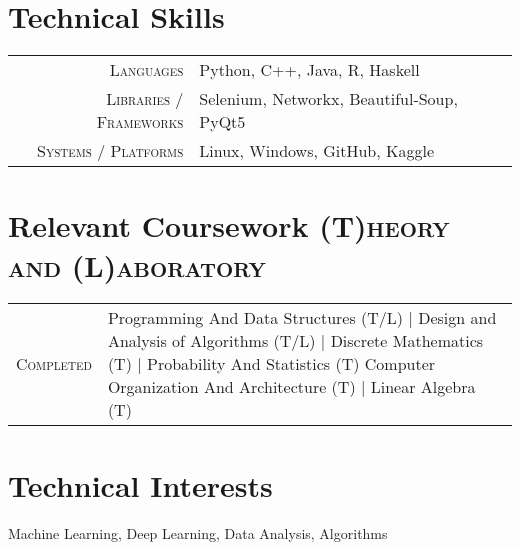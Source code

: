 \documentclass[a4paper,10pt]{extarticle} %
\begin{document}
\vspace{-0.6cm}
\section{\textcolor{primary}{Technical Skills}}

\begin{tabular}{r|p{15cm}}
\textsc{Languages} &  Python, C++, Java, R, Haskell \\
\textsc{Libraries / Frameworks} & Selenium, Networkx, Beautiful-Soup, PyQt5\\
\textsc{Systems / Platforms} &  Linux, Windows, GitHub, Kaggle \\
\end{tabular}
\vspace{0.4cm}



\vspace{-0.2cm}
\section{\textcolor{primary}{Relevant Coursework}
\hfill\small\textsc{(T)heory and (L)aboratory}}

\begin{tabular}{r|p{15cm}}
\textsc{Completed} & Programming And Data Structures (T/L) | Design and Analysis of Algorithms (T/L) | Discrete Mathematics (T) | Probability And Statistics (T) Computer Organization And Architecture (T) | Linear Algebra (T) \\
\end{tabular}
\vspace{0.4cm}






\vspace{-0.4cm}
\section{\textcolor{primary}{Technical Interests}}
\noindent Machine Learning, Deep Learning, Data Analysis,  Algorithms \\
\vspace{0.4cm}
\end{document}
